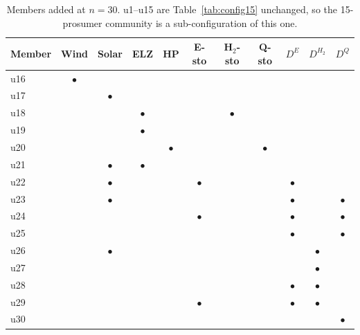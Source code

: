 \begin{table}[!t]
\caption{Members added at $n=30$. u1--u15 are Table~\ref{tab:config15} unchanged, so the 15-prosumer community is a sub-configuration of this one.}
\label{tab:config30}
\centering
\footnotesize
\setlength{\tabcolsep}{3pt}
\begin{tabular}{@{}lcccccccccc@{}}
\toprule
Member & Wind & Solar & ELZ & HP & E-sto & H$_2$-sto & Q-sto & $D^{E}$ & $D^{H_2}$ & $D^{Q}$ \\
\midrule
u16 & $\bullet$ &  &  &  &  &  &  &  &  &  \\
u17 &  & $\bullet$ &  &  &  &  &  &  &  &  \\
u18 &  &  & $\bullet$ &  &  & $\bullet$ &  &  &  &  \\
u19 &  &  & $\bullet$ &  &  &  &  &  &  &  \\
u20 &  &  &  & $\bullet$ &  &  & $\bullet$ &  &  &  \\
u21 &  & $\bullet$ & $\bullet$ &  &  &  &  &  &  &  \\
u22 &  & $\bullet$ &  &  & $\bullet$ &  &  & $\bullet$ &  &  \\
u23 &  & $\bullet$ &  &  &  &  &  & $\bullet$ &  & $\bullet$ \\
u24 &  &  &  &  & $\bullet$ &  &  & $\bullet$ &  & $\bullet$ \\
u25 &  &  &  &  &  &  &  & $\bullet$ &  & $\bullet$ \\
u26 &  & $\bullet$ &  &  &  &  &  &  & $\bullet$ &  \\
u27 &  &  &  &  &  &  &  &  & $\bullet$ &  \\
u28 &  &  &  &  &  &  &  & $\bullet$ & $\bullet$ &  \\
u29 &  &  &  &  & $\bullet$ &  &  & $\bullet$ & $\bullet$ &  \\
u30 &  &  &  &  &  &  &  &  &  & $\bullet$ \\
\bottomrule
\end{tabular}
\end{table}


